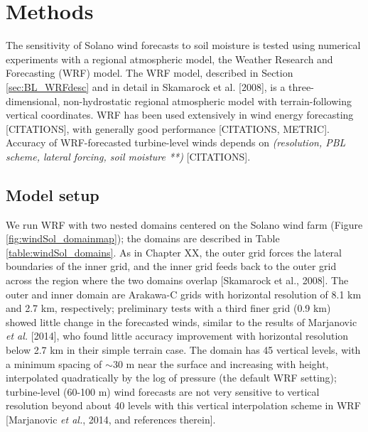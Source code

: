 
%
%
%
%
%

\section{Methods}

The sensitivity of Solano wind forecasts to soil moisture is tested using numerical experiments with a regional atmospheric model, the Weather Research and Forecasting (WRF) model.  The WRF model, described in Section \ref{sec:BL_WRFdesc} and in detail in Skamarock et al. [2008], is a three-dimensional, non-hydrostatic regional atmospheric model with terrain-following vertical coordinates. WRF has been used extensively in wind energy forecasting [CITATIONS], with generally good performance [CITATIONS, METRIC].  Accuracy of WRF-forecasted turbine-level winds depends on \textit{(resolution, PBL scheme, lateral forcing, soil moisture **)} [CITATIONS].

\subsection{Model setup}

We run WRF with two nested domains centered on the Solano wind farm (Figure \ref{fig:windSol_domainmap}); the domains are described in Table \ref{table:windSol_domains}.  As in Chapter XX, the outer grid forces the lateral boundaries of the inner grid, and the inner grid feeds back to the outer grid across the region where the two domains overlap [Skamarock et al., 2008].  The outer and inner domain are Arakawa-C grids with horizontal resolution of 8.1 km and 2.7 km, respectively; preliminary tests with a third finer grid (0.9 km) showed little change in the forecasted winds, similar to the results of Marjanovic \textit{et al.} [2014], who found little accuracy improvement with horizontal resolution below 2.7 km in their simple terrain case.  The domain has 45 vertical levels, with a minimum spacing of $\sim$30 m near the surface and increasing with height, interpolated quadratically by the log of pressure (the default WRF setting); turbine-level (60-100 m) wind forecasts are not very sensitive to vertical resolution beyond about 40 levels with this vertical interpolation scheme in WRF [Marjanovic \textit{et al.}, 2014, and references therein].

